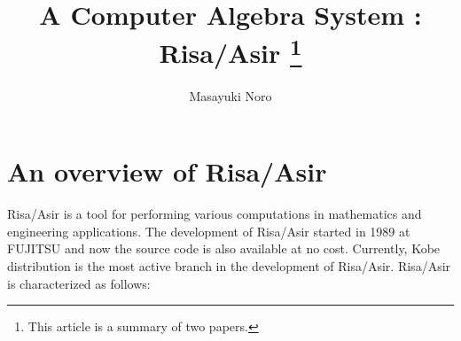 \documentclass[12pt]{article}
\begin{document}
%
%
%
\title{A Computer Algebra System : Risa/Asir \footnote{This article is
a summary of two papers\cite{NORO}\cite{MAEKAWA}.}}
%
%
%
\author{Masayuki Noro}
\date{}
%
%
%

\maketitle              %


\section{An overview of Risa/Asir}

Risa/Asir is a tool for performing various computations in
mathematics and engineering applications. 
The development of Risa/Asir started in 1989 at FUJITSU
and now the source code is also available at no cost.
Currently, Kobe distribution
is the most active branch in the development of Risa/Asir. 
Risa/Asir is characterized as follows:
\end{document}
